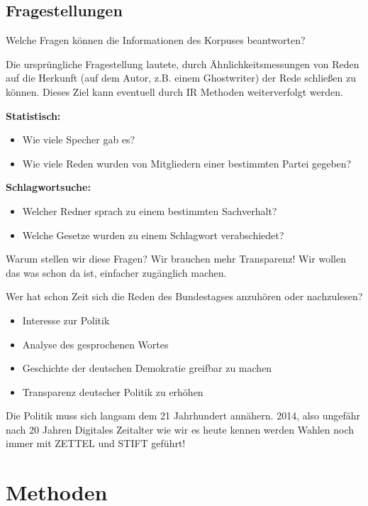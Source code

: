 \documentclass[11pt, a4paper]{beamer}
\begin{document}
\subsection{Fragestellungen}
\begin{frame}{Welche Fragen können die Informationen des Korpuses beantworten?}

Die ursprüngliche Fragestellung lautete, durch Ähnlichkeitsmessungen von Reden
auf die Herkunft (auf dem Autor, z.B. einem Ghostwriter) der Rede schließen zu
können. Dieses Ziel kann eventuell durch IR Methoden weiterverfolgt werden.  

\textbf{Statistisch:}
\begin{itemize}
\item Wie viele Specher gab es?
\item Wie viele Reden wurden von Mitgliedern einer bestimmten Partei gegeben?
\end{itemize}
\textbf{Schlagwortsuche:}
\begin{itemize}
\item Welcher Redner sprach zu einem bestimmten Sachverhalt?
\item Welche Gesetze wurden zu einem Schlagwort verabschiedet?
\end{itemize}
\end{frame}
\begin{frame}{Warum stellen wir diese Fragen?}
Wir brauchen mehr Transparenz! Wir wollen das was schon da ist, einfacher
zugänglich machen.

Wer hat schon Zeit sich die Reden des Bundestagses anzuhören oder nachzulesen?

\begin{itemize}
\item Interesse zur Politik
\item Analyse des gesprochenen Wortes 
\item Geschichte der deutschen Demokratie greifbar zu machen
\item Transparenz deutscher Politik zu erhöhen
\end{itemize}

Die Politik muss sich langsam dem 21 Jahrhundert annähern. 
2014, also ungefähr nach 20 Jahren Digitales Zeitalter wie wir es heute kennen
werden Wahlen noch immer mit ZETTEL und STIFT geführt!

\end{frame}
\section{Methoden}
\end{document}

